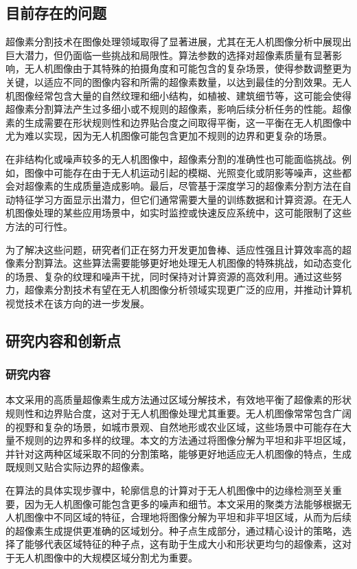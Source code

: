 \subsection{目前存在的问题}
超像素分割技术在图像处理领域取得了显著进展，尤其在无人机图像分析中展现出巨大潜力，但仍面临一些挑战和局限性。算法参数的选择对超像素质量有显著影响，无人机图像由于其特殊的拍摄角度和可能包含的复杂场景，使得参数调整更为关键，以适应不同的图像内容和所需的超像素数量，以达到最佳的分割效果。无人机图像经常包含大量的自然纹理和细小结构，如植被、建筑细节等，这可能会使得超像素分割算法产生过多细小或不规则的超像素，影响后续分析任务的性能。超像素的生成需要在形状规则性和边界贴合度之间取得平衡，这一平衡在无人机图像中尤为难以实现，因为无人机图像可能包含更加不规则的边界和更复杂的场景。\cite{JSJA2023S1052}

在非结构化或噪声较多的无人机图像中，超像素分割的准确性也可能面临挑战。例如，图像中可能存在由于无人机运动引起的模糊、光照变化或阴影等噪声，这些都会对超像素的生成质量造成影响。最后，尽管基于深度学习的超像素分割方法在自动特征学习方面显示出潜力，但它们通常需要大量的训练数据和计算资源。在无人机图像处理的某些应用场景中，如实时监控或快速反应系统中，这可能限制了这些方法的可行性。

为了解决这些问题，研究者们正在努力开发更加鲁棒、适应性强且计算效率高的超像素分割算法。这些算法需要能够更好地处理无人机图像的特殊挑战，如动态变化的场景、复杂的纹理和噪声干扰，同时保持对计算资源的高效利用。通过这些努力，超像素分割技术有望在无人机图像分析领域实现更广泛的应用，并推动计算机视觉技术在该方向的进一步发展。

\subsection{研究内容和创新点}
\subsubsection{研究内容}
本文采用的高质量超像素生成方法通过区域分解技术，有效地平衡了超像素的形状规则性和边界贴合度，这对于无人机图像处理尤其重要。无人机图像常常包含广阔的视野和复杂的场景，如城市景观、自然地形或农业区域，这些场景中可能存在大量不规则的边界和多样的纹理。本文的方法通过将图像分解为平坦和非平坦区域，并针对这两种区域采取不同的分割策略，能够更好地适应无人机图像的特点，生成既规则又贴合实际边界的超像素。

在算法的具体实现步骤中，轮廓信息的计算对于无人机图像中的边缘检测至关重要，因为无人机图像可能包含更多的噪声和细节。本文采用的聚类方法能够根据无人机图像中不同区域的特征，合理地将图像分解为平坦和非平坦区域，从而为后续的超像素生成提供更准确的区域划分。种子点生成部分，通过精心设计的策略，选择了能够代表区域特征的种子点，这有助于生成大小和形状更均匀的超像素，这对于无人机图像中的大规模区域分割尤为重要。\cite{JSJA2023S2045}

